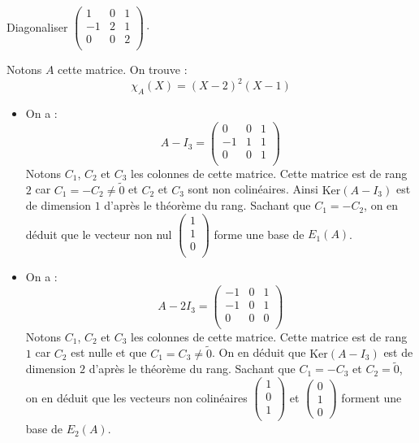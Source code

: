 \documentclass[a4paper,10pt]{report}
\begin{document}
\begin{Exa} Diagonaliser $\begin{pmatrix}
1 & 0& 1 \\
-1 & 2 & 1 \\
0 & 0 & 2 \\
\end{pmatrix}\cdot$
\end{Exa}

\corr Notons $A$ cette matrice. On trouve :
$$ \chi_A(X) = (X-2)^2(X-1)$$
\begin{itemize}
\item On a : 
$$ A- I_3 = \begin{pmatrix}
0 & 0& 1 \\
-1 & 1 & 1 \\
0 & 0 & 1 \\
\end{pmatrix}$$
Notons $C_1$, $C_2$ et $C_3$ les colonnes de cette matrice. Cette matrice est de rang $2$ car $C_1=-C_2 \neq \tilde{0}$ et $C_2$ et $C_3$ sont non colinéaires. Ainsi $\textrm{Ker}(A-I_3)$ est de dimension $1$ d'après le théorème du rang. Sachant que $C_1=-C_2$, on en déduit que le vecteur non nul $\begin{pmatrix}
1 \\
1 \\
0 \\
\end{pmatrix}$ forme une base de $E_1(A)$.
\item On a : 
$$ A- 2I_3 = \begin{pmatrix}
-1 & 0& 1 \\
-1 & 0 & 1 \\
0 & 0 & 0 \\
\end{pmatrix}$$
Notons $C_1$, $C_2$ et $C_3$ les colonnes de cette matrice. Cette matrice est de rang $1$ car $C_2$ est nulle et que $C_1=C_3 \neq \tilde{0}$. On en déduit que $\textrm{Ker}(A-I_3)$ est de dimension $2$ d'après le théorème du rang. Sachant que $C_1=-C_3$ et $C_2= \tilde{0}$, on en déduit que les vecteurs non colinéaires $\begin{pmatrix}
1 \\
0 \\
1 \\
\end{pmatrix}$ et $\begin{pmatrix}
0 \\
1 \\
0
\end{pmatrix}$ forment une base de $E_2(A)$. 
\end{itemize}
\end{document}
